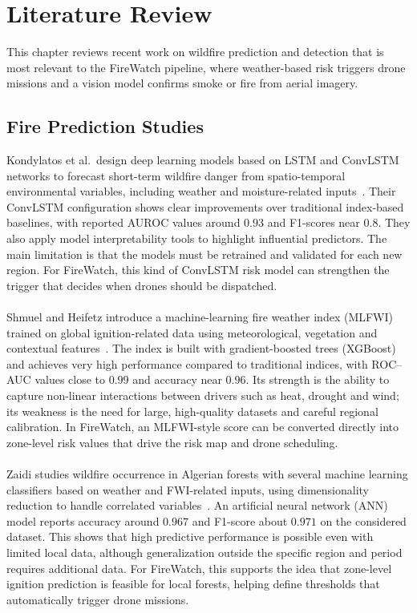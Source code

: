 \chapter{Literature Review}

This chapter reviews recent work on wildfire prediction and detection that is most relevant to the FireWatch pipeline, where weather-based risk triggers drone missions and a vision model confirms smoke or fire from aerial imagery.

\section{Fire Prediction Studies}

Kondylatos et al.\ design deep learning models based on LSTM and ConvLSTM networks to forecast short-term wildfire danger from spatio-temporal environmental variables, including weather and moisture-related inputs~\cite{kondylatos2022}. Their ConvLSTM configuration shows clear improvements over traditional index-based baselines, with reported AUROC values around $0.93$ and F1-scores near $0.8$. They also apply model interpretability tools to highlight influential predictors. The main limitation is that the models must be retrained and validated for each new region. For FireWatch, this kind of ConvLSTM risk model can strengthen the trigger that decides when drones should be dispatched.
\\  \\
Shmuel and Heifetz introduce a machine-learning fire weather index (MLFWI) trained on global ignition-related data using meteorological, vegetation and contextual features~\cite{shmuel2023}. The index is built with gradient-boosted trees (XGBoost) and achieves very high performance compared to traditional indices, with ROC--AUC values close to $0.99$ and accuracy near $0.96$. Its strength is the ability to capture non-linear interactions between drivers such as heat, drought and wind; its weakness is the need for large, high-quality datasets and careful regional calibration. In FireWatch, an MLFWI-style score can be converted directly into zone-level risk values that drive the risk map and drone scheduling.
\\ \\
Zaidi studies wildfire occurrence in Algerian forests with several machine learning classifiers based on weather and FWI-related inputs, using dimensionality reduction to handle correlated variables~\cite{zaidi2023}. An artificial neural network (ANN) model reports accuracy around $0.967$ and F1-score about $0.971$ on the considered dataset. This shows that high predictive performance is possible even with limited local data, although generalization outside the specific region and period requires additional data. For FireWatch, this supports the idea that zone-level ignition prediction is feasible for local forests, helping define thresholds that automatically trigger drone missions.

